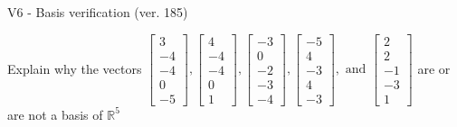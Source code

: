 \begin{exercise}
  \begin{exerciseTitle}V6 - Basis verification (ver. 185)\end{exerciseTitle}
  \begin{exerciseStatement}
    Explain why the vectors \(\left[\begin{array}{r}
3 \\
-4 \\
-4 \\
0 \\
-5
\end{array}\right] , \left[\begin{array}{r}
4 \\
-4 \\
-4 \\
0 \\
1
\end{array}\right] , \left[\begin{array}{r}
-3 \\
0 \\
-2 \\
-3 \\
-4
\end{array}\right] , \left[\begin{array}{r}
-5 \\
4 \\
-3 \\
4 \\
-3
\end{array}\right] , \text{ and } \left[\begin{array}{r}
2 \\
2 \\
-1 \\
-3 \\
1
\end{array}\right]\) are or are not a basis of \(\mathbb{R}^5\)	



\end{exerciseStatement}
\end{exercise}
